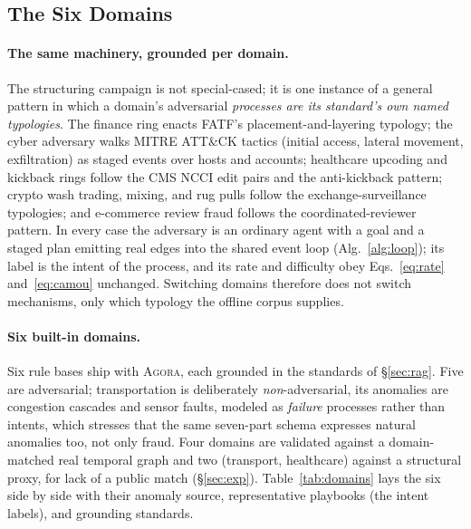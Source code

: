\documentclass[sigconf,review,anonymous]{acmart}
\newcommand{\sys}{\textsc{Agora}\xspace}
\begin{document}
\subsection{The Six Domains}
\label{sec:domains}

\paragraph{The same machinery, grounded per domain.}
The structuring campaign is not special-cased; it is one instance of a general
pattern in which a domain's adversarial \emph{processes are its standard's own named
typologies}. The finance ring enacts FATF's placement-and-layering typology; the
cyber adversary walks MITRE ATT\&CK tactics (initial access, lateral movement,
exfiltration) as staged events over hosts and accounts; healthcare upcoding and
kickback rings follow the CMS NCCI edit pairs and the anti-kickback pattern; crypto
wash trading, mixing, and rug pulls follow the exchange-surveillance typologies; and
e-commerce review fraud follows the coordinated-reviewer pattern. In every case the
adversary is an ordinary agent with a goal and a staged plan emitting real edges into
the shared event loop (Alg.~\ref{alg:loop}); its label is the intent of the process,
and its rate and difficulty obey Eqs.~\eqref{eq:rate} and~\eqref{eq:camou} unchanged. Switching domains therefore
does not switch mechanisms, only which typology the offline corpus supplies.

\paragraph{Six built-in domains.}
Six rule bases ship with \sys{}, each grounded in the standards of \S\ref{sec:rag}.
Five are adversarial; transportation is deliberately \emph{non}-adversarial, its
anomalies are congestion cascades and sensor faults, modeled as \emph{failure}
processes rather than intents, which stresses that the same seven-part schema
expresses natural anomalies too, not only fraud. Four domains are validated against a
domain-matched real temporal graph and two (transport, healthcare) against a structural
proxy, for lack of a public match (\S\ref{sec:exp}). Table~\ref{tab:domains} lays the
six side by side with their anomaly source, representative playbooks (the intent
labels), and grounding standards.
\end{document}
